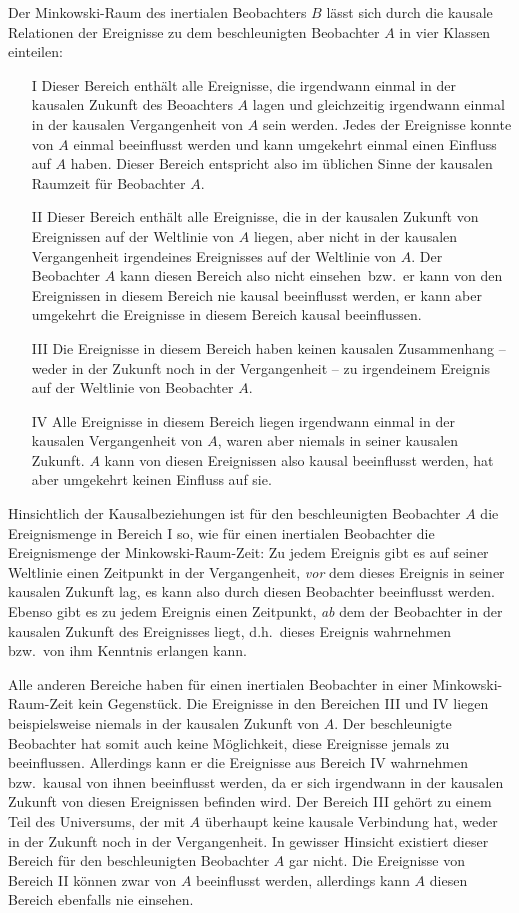 Der Minkowski-Raum des inertialen Beobachters $B$ 
l\"asst sich durch die kausale Relationen der Ereignisse 
zu dem beschleunigten Beobachter $A$ in vier Klassen 
einteilen:
\begin{itemize}
\item[I]
Dieser Bereich enth\"alt alle Ereignisse, die irgendwann 
einmal in der kausalen Zukunft des Beoachters $A$ lagen 
und gleichzeitig irgendwann einmal in der kausalen 
Vergangenheit von $A$ sein werden. Jedes der Ereignisse
konnte von $A$ einmal beeinflusst werden und kann
umgekehrt einmal einen Einfluss auf $A$ haben.
Dieser Bereich entspricht also im \"ublichen Sinne der 
kausalen Raumzeit f\"ur Beobachter $A$.
\item[II]
Dieser Bereich enth\"alt alle Ereignisse, die in der kausalen Zukunft
von Ereignissen auf der Weltlinie von $A$ liegen, aber nicht 
in der kausalen Vergangenheit irgendeines Ereignisses auf der Weltlinie 
von $A$. Der Beobachter $A$ kann diesen Bereich also nicht 
\glqq einsehen\grqq\ bzw.\ er kann von den Ereignissen in
diesem Bereich nie
kausal beeinflusst werden, er kann aber umgekehrt die 
Ereignisse in diesem Bereich kausal beeinflussen.
\item[III]
Die Ereignisse in diesem Bereich haben keinen kausalen Zusammenhang --
weder in der Zukunft noch in der Vergangenheit --
zu irgendeinem Ereignis auf der Weltlinie von Beobachter $A$. 
\item[IV]
Alle Ereignisse in diesem Bereich liegen irgendwann einmal in der kausalen
Vergangenheit von $A$, waren aber niemals in seiner kausalen Zukunft.
$A$ kann von diesen Ereignissen also kausal beeinflusst
werden, hat aber umgekehrt keinen Einfluss auf sie.
\end{itemize}
Hinsichtlich der Kausalbeziehungen ist f\"ur den
beschleunigten Beobachter $A$ die Ereignismenge in 
Bereich I so, wie f\"ur einen inertialen Beobachter 
die Ereignismenge der
Minkowski-Raum-Zeit: Zu jedem Ereignis gibt es 
auf seiner Weltlinie
einen Zeitpunkt in der Vergangenheit, 
{\em vor} dem dieses Ereignis in seiner kausalen Zukunft
lag, es kann also durch diesen Beobachter
beeinflusst werden. Ebenso gibt es zu jedem Ereignis einen
Zeitpunkt, {\em ab} dem der Beobachter in der kausalen Zukunft des
Ereignisses liegt, d.h.\ dieses Ereignis wahrnehmen bzw.\ von 
ihm Kenntnis erlangen kann.

Alle anderen Bereiche haben f\"ur einen inertialen Beobachter in
einer Minkowski-Raum-Zeit kein Gegenst\"uck. Die Ereignisse in den
Bereichen III und IV liegen beispielsweise niemals in der kausalen
Zukunft von $A$. Der beschleunigte Beobachter hat somit auch keine
M\"oglichkeit, diese Ereignisse jemals zu beeinflussen. 
Allerdings kann er die Ereignisse aus Bereich IV
wahrnehmen bzw.\ kausal von ihnen beeinflusst werden, da
er sich irgendwann in der kausalen Zukunft von diesen 
Ereignissen befinden wird.
Der Bereich III geh\"ort zu einem Teil des Universums, der mit $A$
\"uberhaupt keine kausale Verbindung hat, weder in der Zukunft noch
in der Vergangenheit. In gewisser Hinsicht existiert dieser Bereich f\"ur
den beschleunigten Beobachter $A$ gar nicht. Die Ereignisse von Bereich II
k\"onnen zwar von $A$ beeinflusst werden, allerdings kann $A$ diesen 
Bereich ebenfalls nie einsehen.

